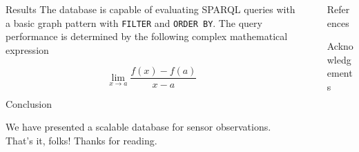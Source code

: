 \documentclass[final]{beamer}
\newlength{\sepwid}
\newlength{\onecolwid}
\newlength{\twocolwid}
\begin{document}
\begin{frame}[t]
\begin{columns}[t]
\begin{column}{\twocolwid}
\begin{block}{Results}
The database is capable of evaluating SPARQL queries with a basic graph pattern with \texttt{FILTER} and \texttt{ORDER BY}. The query performance is determined by the following complex mathematical expression

\begin{displaymath}
\lim_{x \to a} \frac{f(x) - f(a)}{x - a}
\end{displaymath}

\end{block}

\begin{block}{Conclusion}

We have presented a scalable database for sensor observations. That's it, folks! Thanks for reading.

\end{block}

\end{column} %

\begin{column}{\sepwid}\end{column} %

\begin{column}{\onecolwid} %

\begin{block}{References}

\small{
\vspace{0.75in}}

\end{block}


\begin{block}{Acknowledgements}

\small{} \\

\end{block}

\end{column} %
\end{columns} %
\end{frame} %
\end{document}
